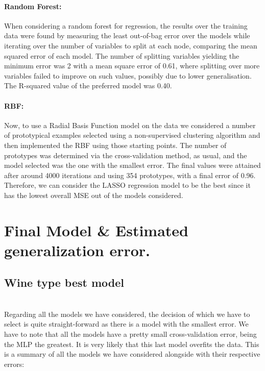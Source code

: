 \documentclass[10pt]{article}
\begin{document}
\paragraph{Random Forest:}

When considering a random forest for regression, the results over the training data were found by measuring the least out-of-bag error over the models while iterating over the number of variables to split at each node, comparing the mean squared error of each model. The number of splitting variables yielding the minimum error was 2 with a mean square error of 0.61, where splitting over more variables failed to improve on such values, possibly due to lower generalisation. The R-squared value of the preferred model was 0.40.

\paragraph{RBF:}

Now, to use a Radial Basis Function model on the data we considered a number of prototypical examples selected using a non-supervised clustering algorithm and then implemented the RBF using those starting points. The number of prototypes was determined via the cross-validation method, as usual, and the model selected was the one with the smallest error. The final values were attained after around 4000 iterations and using 354 prototypes, with a final error of 0.96.\\

Therefore, we can consider the LASSO regression model to be the best since it has the lowest overall MSE out of the models considered.

\section{Final Model \& Estimated generalization error.}
\subsection{Wine type best model}
\ \\

Regarding all the models we have considered, the decision of which we have to select is quite straight-forward as there is a model with the smallest error. We have to note that all the models have a pretty small cross-validation error, being the MLP the greatest. It is very likely that this last model overfits the data. This is a summary of all the models we have considered alongside with their respective errors:
\end{document}
